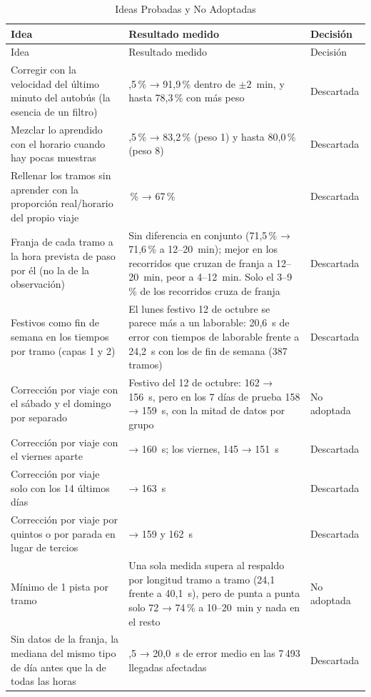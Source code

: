 \begin{longtable}{@{}>{\raggedright\arraybackslash}p{}>{\raggedright\arraybackslash}p{}>{\raggedright\arraybackslash}p{}@{}}
\caption{Ideas Probadas y No Adoptadas}\label{tab:descartadas}\\
\toprule
Idea & Resultado medido & Decisión\\
\midrule
\endfirsthead
\toprule
Idea & Resultado medido & Decisión\\
\midrule
\endhead
\bottomrule
\endfoot
Corregir con la velocidad del último minuto del autobús (la esencia de un filtro) & 92,5\,\% → 91,9\,\% dentro de $\pm2$~min, y hasta 78,3\,\% con más peso & Descartada\\
Mezclar lo aprendido con el horario cuando hay pocas muestras & 83,5\,\% → 83,2\,\% (peso 1) y hasta 80,0\,\% (peso 8) & Descartada\\
Rellenar los tramos sin aprender con la proporción real/horario del propio viaje & 70\,\% → 67\,\% & Descartada\\
Franja de cada tramo a la hora prevista de paso por él (no la de la observación) & Sin diferencia en conjunto (71,5\,\% → 71,6\,\% a 12--20~min); mejor en los recorridos que cruzan de franja a 12--20~min, peor a 4--12~min. Solo el 3--9\,\% de los recorridos cruza de franja & Descartada\\
Festivos como fin de semana en los tiempos por tramo (capas 1 y 2) & El lunes festivo 12 de octubre se parece más a un laborable: 20,6~s de error con tiempos de laborable frente a 24,2~s con los de fin de semana (387 tramos) & Descartada\\
Corrección por viaje con el sábado y el domingo por separado & Festivo del 12 de octubre: 162 → 156~s, pero en los 7 días de prueba 158 → 159~s, con la mitad de datos por grupo & No adoptada\\
Corrección por viaje con el viernes aparte & 158 → 160~s; los viernes, 145 → 151~s & Descartada\\
Corrección por viaje solo con los 14 últimos días & 158 → 163~s & Descartada\\
Corrección por viaje por quintos o por parada en lugar de tercios & 158 → 159 y 162~s & Descartada\\
Mínimo de 1 pista por tramo & Una sola medida supera al respaldo por longitud tramo a tramo (24,1 frente a 40,1~s), pero de punta a punta solo 72 → 74\,\% a 10--20~min y nada en el resto & No adoptada\\
Sin datos de la franja, la mediana del mismo tipo de día antes que la de todas las horas & 19,5 → 20,0~s de error medio en las 7\,493 llegadas afectadas & Descartada\\

\end{longtable}
